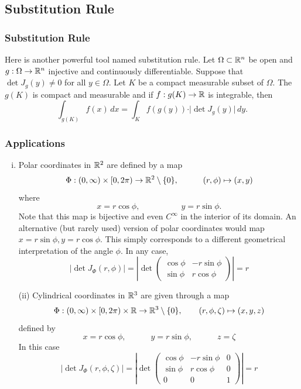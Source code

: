 \documentclass[12pt, t]{beamer}
\begin{document}
\subsection{Substitution Rule}
\begin{frame}
    \frametitle{Substitution Rule}
    Here is another powerful tool named substitution rule. Let $\Omega\subset\mathbb{R}^n$ be open and $g:\Omega\to\mathbb{R}^n$ injective and continuously dif{}ferentiable. Suppose that $\det J_g(y)\neq0$ for all $y\in\Omega$. Let $K$ be a compact measurable subset of $\Omega$. The $g(K)$ is compact and measurable and if $f:g(K)\to\mathbb{R}$ is integrable, then
    \[\int_{g(K)}f(x)\,dx=\int_Kf(g(y))\cdot
        \vert\det J_g(y)\vert\,dy.\]
\end{frame}

\begin{frame}[allowframebreaks]
    \frametitle{Applications}
    \begin{enumerate}[(i)]
        \item Polar coordinates in $\mathbb{R}^2$ are defined by a map
              \[\Phi:(0,\infty)\times[0,2\pi)\to\mathbb{R}^2\setminus\{0\},
                  \qquad\quad(r,\phi)\mapsto(x,y)\]
              where
              \[x=r\cos\phi,\qquad\qquad\quad
                  y=r\sin\phi.\]
              Note that this map is bijective and even $C^\infty$ in the interior of its
              domain. An alternative (but rarely used) version of polar coordinates
              would map $x=r\sin\phi,y=r\cos\phi$. This simply corresponds to a
              dif{}ferent geometrical interpretation of the angle $\phi$. In any case,
              \[|\det J_\Phi(r,\phi)|=\left|\det\begin{pmatrix}
                      \cos\phi & -r\sin\phi \\
                      \sin\phi & r\cos\phi
                  \end{pmatrix}\right|=r\]
    \end{enumerate}
    \begin{itemize}
        \item[(ii)] Cylindrical coordinates in $\mathbb{R}^3$ are given through a map
              \[\Phi:(0,\infty)\times[0,2\pi)\times\mathbb{R}\to\mathbb{R}^3\setminus\{0\},\qquad
                  (r,\phi,\zeta)\mapsto(x,y,z)\]
              defined by
              \[x=r\cos\phi,\qquad\quad y=r\sin\phi,\qquad\quad z=\zeta\]
              In this case
              \[|\det J_\Phi(r,\phi,\zeta)|=\left|\det\begin{pmatrix}
                      \cos\phi & -r\sin\phi & 0 \\
                      \sin\phi & r\cos\phi  & 0 \\
                      0        & 0          & 1
                  \end{pmatrix}\right|=r\]


\end{itemize}
\end{frame}
\end{document}
